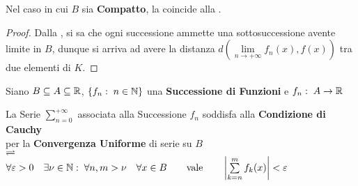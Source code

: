 \begin{proposition}
	\label{prop:in_compat_succ_funz_cau_corrisp_a_succ_cau}
	Nel caso in cui $B$ sia \textbf{Compatto}, la  coincide alla .
	\begin{proof}
		Dalla , si sa che ogni successione ammette una sottosuccessione avente limite in $B$, dunque si arriva ad avere la distanza $d \left( \lim\limits_{n \to +\infty}f_n(x), f(x) \right)$ tra due elementi di $K$.
	\end{proof}
\end{proposition}
\begin{definition}
	Siano $B \subseteq A \subseteq \mathbb{R}$, $\left\{f_n:\; n \in \mathbb{N}\right\}$ una \textbf{Successione di Funzioni} e $f_n:\; A \to \mathbb{R}$
	\begin{center}
		La Serie $\sum\limits_{n = 0}^{+\infty}$ associata alla Successione $f_n$ soddisfa alla \textbf{Condizione di Cauchy}\\
		per la \textbf{Convergenza Uniforme} di serie su $B$\\
		$\rightleftharpoons$\\
		$
			\forall \varepsilon > 0 \quad \exists \nu \in \N:\; \forall n, m > \nu \quad \forall x \in B %
			\qquad \text{vale} \qquad \abs{ \sum\limits_{k = n}^{m} f_k(x) } < \varepsilon
		$
	\end{center}
\end{definition}

